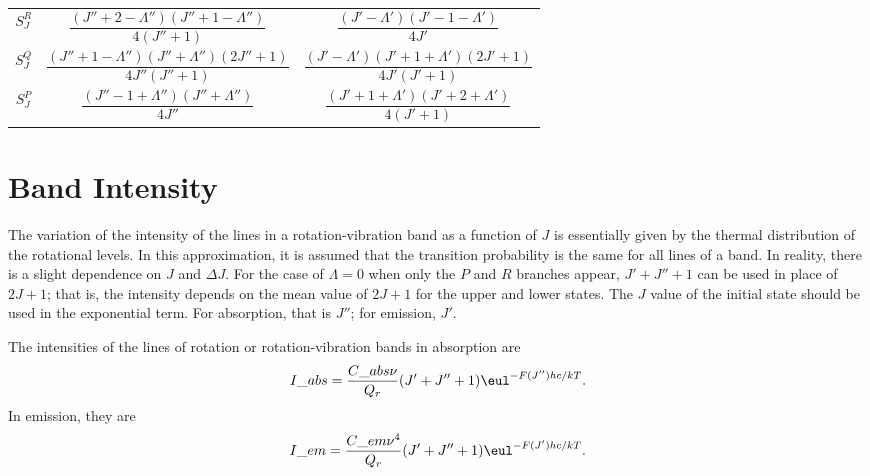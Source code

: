 \begin{table}[H]
\begin{tabular}{ccc}
        $S_{J}^{R}$ & $\dfrac{(J'' + 2 - \Lambda'')(J'' + 1 - \Lambda'')}{4(J'' + 1)}$          & $\dfrac{(J' - \Lambda')(J' - 1 - \Lambda')}{4J'}$                  \\
        \addlinespace[0.5em]
        $S_{J}^{Q}$ & $\dfrac{(J'' + 1 - \Lambda'')(J'' + \Lambda'')(2J'' + 1)}{4J''(J'' + 1)}$ & $\dfrac{(J' - \Lambda')(J' + 1 + \Lambda')(2J' + 1)}{4J'(J' + 1)}$ \\
        \addlinespace[0.5em]
        $S_{J}^{P}$ & $\dfrac{(J'' - 1 + \Lambda'')(J'' + \Lambda'')}{4J''}$                    & $\dfrac{(J' + 1 + \Lambda')(J' + 2 + \Lambda')}{4(J' + 1)}$        \\
        \bottomrule
    \end{tabular}
\end{table}

\section{Band Intensity}
\label{s:band_intensity}

The variation of the intensity of the lines in a rotation-vibration band as a function of $J$ is essentially given by the thermal distribution of the rotational levels. In this approximation, it is assumed that the transition probability is the same for all lines of a band. In reality, there is a slight dependence on $J$ and $\Delta{}J$. For the case of $\Lambda = 0$ when only the $P$ and $R$ branches appear, $J' + J'' + 1$ can be used in place of $2J + 1$; that is, the intensity depends on the mean value of $2J + 1$ for the upper and lower states. The $J$ value of the initial state should be used in the exponential term. For absorption, that is $J''$; for emission, $J'$.

The intensities of the lines of rotation or rotation-vibration bands in absorption are
\begin{equation}
    I\_{abs} = \frac{C\_{abs}\nu}{Q_{r}}(J' + J'' + 1)\eul^{-F(J'')hc/kT}.
\end{equation}
In emission, they are
\begin{equation}
    I\_{em} = \frac{C\_{em}\nu^{4}}{Q_{r}}(J' + J'' + 1)\eul^{-F(J')hc/kT}.
\end{equation}
